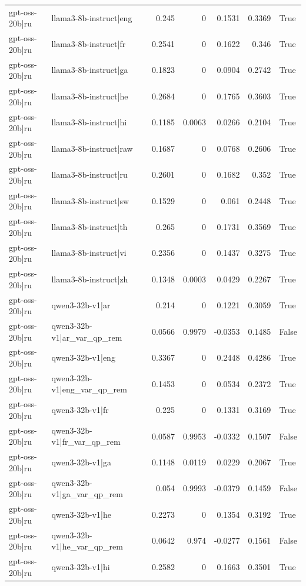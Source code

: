 \begin{table}
\begin{tabular}{l l r r r r l}
gpt-oss-20b|ru & llama3-8b-instruct|eng & 0.245 & 0 & 0.1531 & 0.3369 & True \\
gpt-oss-20b|ru & llama3-8b-instruct|fr & 0.2541 & 0 & 0.1622 & 0.346 & True \\
gpt-oss-20b|ru & llama3-8b-instruct|ga & 0.1823 & 0 & 0.0904 & 0.2742 & True \\
gpt-oss-20b|ru & llama3-8b-instruct|he & 0.2684 & 0 & 0.1765 & 0.3603 & True \\
gpt-oss-20b|ru & llama3-8b-instruct|hi & 0.1185 & 0.0063 & 0.0266 & 0.2104 & True \\
gpt-oss-20b|ru & llama3-8b-instruct|raw & 0.1687 & 0 & 0.0768 & 0.2606 & True \\
gpt-oss-20b|ru & llama3-8b-instruct|ru & 0.2601 & 0 & 0.1682 & 0.352 & True \\
gpt-oss-20b|ru & llama3-8b-instruct|sw & 0.1529 & 0 & 0.061 & 0.2448 & True \\
gpt-oss-20b|ru & llama3-8b-instruct|th & 0.265 & 0 & 0.1731 & 0.3569 & True \\
gpt-oss-20b|ru & llama3-8b-instruct|vi & 0.2356 & 0 & 0.1437 & 0.3275 & True \\
gpt-oss-20b|ru & llama3-8b-instruct|zh & 0.1348 & 0.0003 & 0.0429 & 0.2267 & True \\
gpt-oss-20b|ru & qwen3-32b-v1|ar & 0.214 & 0 & 0.1221 & 0.3059 & True \\
gpt-oss-20b|ru & qwen3-32b-v1|ar_var_qp_rem & 0.0566 & 0.9979 & -0.0353 & 0.1485 & False \\
gpt-oss-20b|ru & qwen3-32b-v1|eng & 0.3367 & 0 & 0.2448 & 0.4286 & True \\
gpt-oss-20b|ru & qwen3-32b-v1|eng_var_qp_rem & 0.1453 & 0 & 0.0534 & 0.2372 & True \\
gpt-oss-20b|ru & qwen3-32b-v1|fr & 0.225 & 0 & 0.1331 & 0.3169 & True \\
gpt-oss-20b|ru & qwen3-32b-v1|fr_var_qp_rem & 0.0587 & 0.9953 & -0.0332 & 0.1507 & False \\
gpt-oss-20b|ru & qwen3-32b-v1|ga & 0.1148 & 0.0119 & 0.0229 & 0.2067 & True \\
gpt-oss-20b|ru & qwen3-32b-v1|ga_var_qp_rem & 0.054 & 0.9993 & -0.0379 & 0.1459 & False \\
gpt-oss-20b|ru & qwen3-32b-v1|he & 0.2273 & 0 & 0.1354 & 0.3192 & True \\
gpt-oss-20b|ru & qwen3-32b-v1|he_var_qp_rem & 0.0642 & 0.974 & -0.0277 & 0.1561 & False \\
gpt-oss-20b|ru & qwen3-32b-v1|hi & 0.2582 & 0 & 0.1663 & 0.3501 & True \\

\end{tabular}
\end{table}
